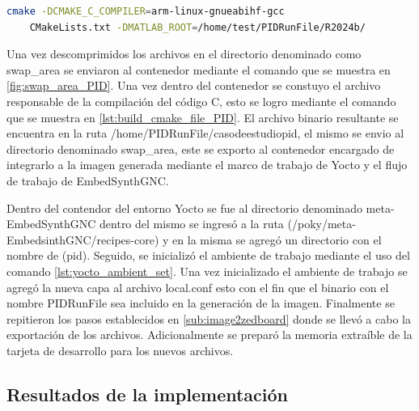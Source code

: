 \begin{lstlisting}[language=bash, caption={Compilacion del programa , Linux}, label=lst:build_cmake_file_PID]
    cmake -DCMAKE_C_COMPILER=arm-linux-gnueabihf-gcc 
    CMakeLists.txt -DMATLAB_ROOT=/home/test/PIDRunFile/R2024b/
\end{lstlisting}

Una vez descomprimidos los archivos en el directorio denominado como swap\_area se enviaron al contenedor mediante el comando que se muestra en \ref{fig:swap_area_PID}. Una vez dentro del contenedor se constuyo el archivo responsable de la compilación del código C, esto se logro mediante el comando que se muestra en \ref{lst:build_cmake_file_PID}. El archivo binario resultante se encuentra en la ruta /home/PIDRunFile/casodeestudiopid, el mismo se envio al directorio denominado swap\_area, este se exporto al contenedor encargado de integrarlo a la imagen generada mediante el marco de trabajo de Yocto y el flujo de trabajo de EmbedSynthGNC. 

Dentro del contendor del entorno Yocto se fue al directorio denominado meta-EmbedSynthGNC dentro del mismo se ingresó a la ruta (/poky/meta-EmbedsinthGNC/recipes-core) y en la misma se agregó un directorio con el nombre de (pid). Seguido, se inicializó el ambiente de trabajo mediante el uso del comando \ref{lst:yocto_ambient_set}. Una vez inicializado el ambiente de trabajo se agregó la nueva capa al archivo local.conf esto con el fin que el binario con el nombre PIDRunFile sea incluido en la generación de la imagen. Finalmente se repitieron los pasos establecidos en \ref{sub:image2zedboard} donde se llevó a cabo la exportación de los archivos. Adicionalmente se preparó la memoria extraíble de la tarjeta de desarrollo para los nuevos archivos.

\subsection{Resultados de la implementación}


